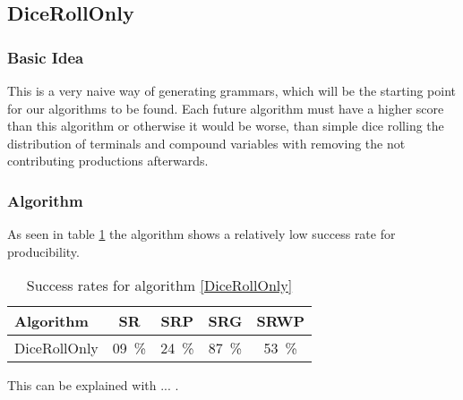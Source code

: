 \pagebreak
\subsection{DiceRollOnly}
\subsubsection{Basic Idea}
\noindent This is a very naive way of generating grammars, which will be the starting point for our algorithms to be found. Each future algorithm must have a higher score than this algorithm or otherwise it would be worse, than simple dice rolling the distribution of terminals and compound variables with removing the not contributing productions afterwards.
\subsubsection{Algorithm}

\noindent
{}
As seen in table \ref{DiceRollOnlySR} the algorithm shows a relatively low success rate for producibility.
\begin{table}[H]
\centering
	\begin{tabular}{ | l || c |c |c |c | }
	\hline
	Algorithm 		& SR 	& SRP 	& SRG 	& SRWP   	\\ \hline
	\hline
	DiceRollOnly 	& 09~\%	& 24~\% & 87~\% & 53~\%		\\ \hline
	\end{tabular}
	\caption{Success rates for algorithm \ref{DiceRollOnly}}
	\label{DiceRollOnlySR}
\end{table}
\noindent This can be explained with ... . 
